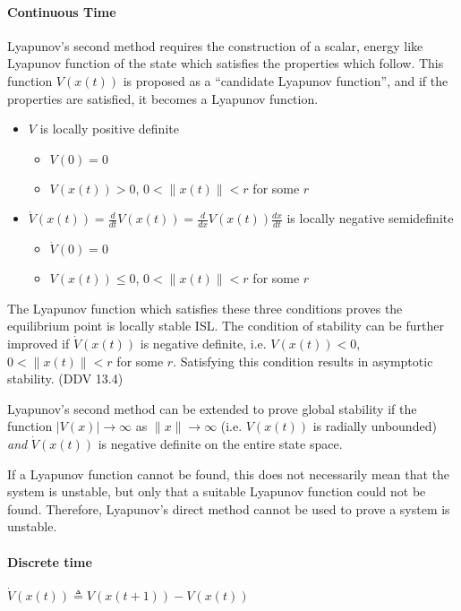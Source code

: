 \paragraph{Continuous Time}
Lyapunov's second method requires the construction of a scalar, energy like Lyapunov function of the state which satisfies the properties which follow.
This function $V(x(t))$ is proposed as a ``candidate Lyapunov function'', and if the properties are satisfied, it becomes a Lyapunov function.
\begin{itemize}
  \item{$V$ is locally positive definite}
  \begin{itemize}
    \item{$V(0)=0$}
    \item{$V(x(t))>0$, $0<\|x(t)\|<r$ for some $r$}
  \end{itemize}
  \item{$\dot{V}(x(t))=\frac{d}{dt}V(x(t))=\frac{d}{dx}V(x(t))\frac{dx}{dt}$ is locally negative semidefinite}
  \begin{itemize}
    \item{$\dot{V}(0)=0$}
    \item{$V(x(t))\leq0$, $0<\|x(t)\|<r$ for some $r$}
  \end{itemize}
\end{itemize}

The Lyapunov function which satisfies these three conditions proves the equilibrium point is locally stable ISL.\@
The condition of stability can be further improved if $\dot{V}(x(t))$ is negative definite, i.e.
$V(x(t))<0$, $0<\|x(t)\|<r$ for some $r$.
Satisfying this condition results in asymptotic stability.
(DDV 13.4)

Lyapunov's second method can be extended to prove global stability if the function $|V(x)|\rightarrow\infty$ as $\|x\|\rightarrow\infty$ (i.e.
$V(x(t))$ is radially unbounded) \textit{and} $\dot{V}(x(t))$ is negative definite on the entire state space.

 If a Lyapunov function cannot be found, this does not necessarily mean that the system is unstable, but only that a suitable Lyapunov function could not be found.
Therefore, Lyapunov's direct method cannot be used to prove a system is unstable.

\paragraph{Discrete time}
$\dot{V}(x(t))\triangleq V(x(t+1))-V(x(t))$

